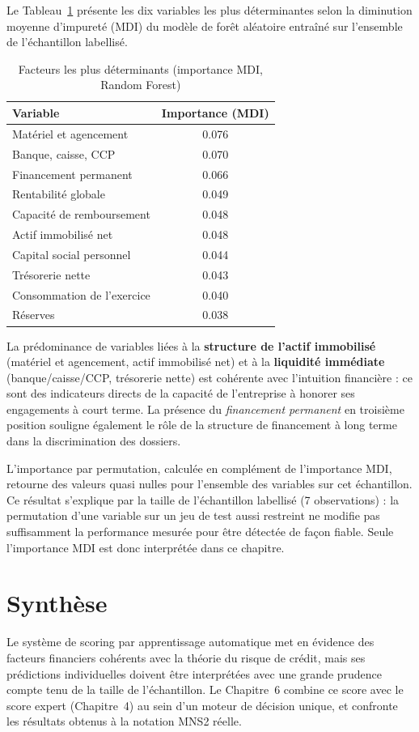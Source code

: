 Le Tableau~\ref{tab:feature-importance} présente les dix variables les plus déterminantes selon
la diminution moyenne d'impureté (MDI) du modèle de forêt aléatoire entraîné sur l'ensemble de
l'échantillon labellisé.

\begin{table}[h]
\centering
\small
\begin{tabular}{@{}lc@{}}
\toprule
\textbf{Variable} & \textbf{Importance (MDI)} \\
\midrule
Matériel et agencement & 0.076 \\
Banque, caisse, CCP & 0.070 \\
Financement permanent & 0.066 \\
Rentabilité globale & 0.049 \\
Capacité de remboursement & 0.048 \\
Actif immobilisé net & 0.048 \\
Capital social personnel & 0.044 \\
Trésorerie nette & 0.043 \\
Consommation de l'exercice & 0.040 \\
Réserves & 0.038 \\
\bottomrule
\end{tabular}
\caption{Facteurs les plus déterminants (importance MDI, Random Forest)}
\label{tab:feature-importance}
\end{table}

La prédominance de variables liées à la \textbf{structure de l'actif immobilisé} (matériel et
agencement, actif immobilisé net) et à la \textbf{liquidité immédiate} (banque/caisse/CCP,
trésorerie nette) est cohérente avec l'intuition financière : ce sont des indicateurs directs de
la capacité de l'entreprise à honorer ses engagements à court terme. La présence du
\emph{financement permanent} en troisième position souligne également le rôle de la structure de
financement à long terme dans la discrimination des dossiers.

\begin{limite}
L'importance par permutation, calculée en complément de l'importance MDI, retourne des valeurs
quasi nulles pour l'ensemble des variables sur cet échantillon. Ce résultat s'explique par la
taille de l'échantillon labellisé (7 observations) : la permutation d'une variable sur un jeu de
test aussi restreint ne modifie pas suffisamment la performance mesurée pour être détectée de
façon fiable. Seule l'importance MDI est donc interprétée dans ce chapitre.
\end{limite}

\section{Synthèse}

Le système de scoring par apprentissage automatique met en évidence des facteurs financiers
cohérents avec la théorie du risque de crédit, mais ses prédictions individuelles doivent être
interprétées avec une grande prudence compte tenu de la taille de l'échantillon. Le
Chapitre~6 combine ce score avec le score expert (Chapitre~4) au sein d'un moteur de décision
unique, et confronte les résultats obtenus à la notation MNS2 réelle.
